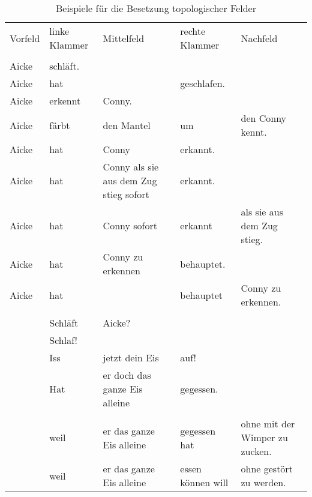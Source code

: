 \begin{table}[htbp]
\begin{sideways}
\begin{tabular}{lllll}
Vorfeld & linke Klammer & Mittelfeld                             & rechte Klammer & Nachfeld                   \\ \\
Aicke    & schläft.                                                                                            \\
Aicke    & hat           &                                        & geschlafen.                                 \\
Aicke    & erkennt       & Conny.                                                                               \\
Aicke    & färbt         & den Mantel                             & um             & den Conny kennt.           \\
Aicke    & hat           & Conny                                  & erkannt.                                    \\
Aicke    & hat           & Conny als sie aus dem Zug stieg sofort & erkannt.                                    \\
Aicke    & hat           & Conny sofort                           & erkannt        & als sie aus dem Zug stieg. \\
Aicke    & hat           & Conny zu erkennen                      & behauptet.                                  \\
Aicke    & hat           &                                        & behauptet      & Conny zu erkennen.         \\ \\
        & Schläft       & Aicke?                                                                                \\
        & Schlaf!                                                                                              \\
        & Iss            & jetzt dein Eis                         & auf!                                        \\
        & Hat           & er doch das ganze Eis alleine          & gegessen.                                   \\  \\
        & weil          & er das ganze Eis alleine               & gegessen hat   & ohne mit der Wimper zu zucken.    \\
        & weil          & er das ganze Eis alleine               & essen können will   & ohne gestört zu werden.    \\
\end{tabular}
\end{sideways}
\caption{\label{bsp-topo}Beispiele für die Besetzung topologischer Felder}
\end{table}

